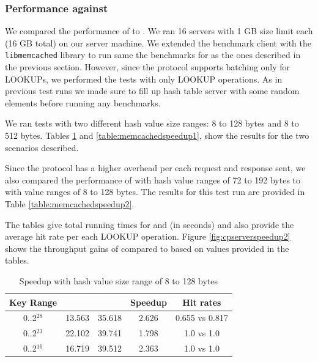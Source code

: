 \subsubsection{Performance against \memcached{}}
We compared the performance of \cpserver{} to \memcached{}. We ran 16 \memcached{} servers with 1 GB size limit each (16 GB total) on our server machine.
We extended the benchmark client with the \texttt{libmemcached} library \cite{libmemcached} to run same the benchmarks for \memcached{} as the ones described in
the previous section. However, since the \memcached{} protocol supports batching only for LOOKUPs, we performed the tests with only LOOKUP operations. As in previous 
test runs we made sure to fill up hash table server with some random elements before running any benchmarks. 

We ran tests with two different hash value size ranges: 8 to 128 bytes and 8 to 512 bytes. 
Tables \ref{table:memcachedspeedup0} and \ref{table:memcachedspeedup1}, show the results for the two scenarios described.

Since the \memcached{} protocol has a higher overhead per each request and response sent, we also compared the performance of \cpserver{} with hash value 
ranges of 72 to 192 bytes to \memcached{} with value ranges of 8 to 128 bytes. The results for this test run are provided in Table \ref{table:memcachedspeedup2}.

The tables give total running times for \cpserver{} and \memcached{} (in seconds) and also provide the average hit rate per each LOOKUP operation.
Figure \ref{fig:cpserverspeedup2} shows the throughput gains of \cpserver{} compared to \memcached{} based on values provided in the tables. 

\begin{table}[!ht]
\centering
\begin{tabular}{ | c | c | c | c | c | }
  \hline
  Key Range & \cpserver{} & \memcached{} & Speedup & Hit rates \\
  \hline
  0..2$^{28}$ & 13.563 & 35.618 & 2.626 & 0.655 vs 0.817 \\
  0..2$^{23}$ & 22.102 & 39.741 & 1.798 & 1.0 vs 1.0     \\
  0..2$^{16}$ & 16.719 & 39.512 & 2.363 & 1.0 vs 1.0     \\
  \hline
\end{tabular}
\caption{Speedup with hash value size range of 8 to 128 bytes} 
\label{table:memcachedspeedup0}
\end{table}

